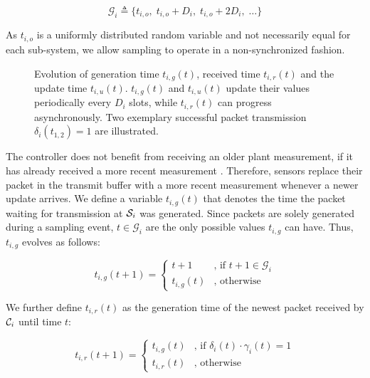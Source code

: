 \begin{equation}
  \mathcal{G}_i \triangleq \lbrace t_{i,o}, \; t_{i,o} + D_{i}, \; t_{i,o} + 2 D_{i}, \; \dots \rbrace 
\end{equation}

As $t_{i,o}$ is a uniformly distributed random variable and not necessarily
equal for each sub-system, we allow sampling to operate in a non-synchronized
fashion. 

\begin{figure}[htb]
  \centering
  \resizebox*{.6\textwidth}{!}{} 

  \caption[Example evolution of generation time $t_{i,g}$, received time
  $t_{i,r}$ and update time $t_{i,u}$]{Evolution of generation time
  $t_{i,g}(t)$, received time $t_{i,r}(t)$ and the update time $t_{i,u}(t)$.
  $t_{i,g}(t)$ and $t_{i,u}(t)$ update their values periodically every $D_i$
  slots, while $t_{i,r}(t)$ can progress asynchronously. Two exemplary
  successful packet transmission $\delta_i(t_{1,2})=1$ are illustrated.}
  \label{fig:ageplot}
\end{figure}  

The controller does not benefit from receiving an older plant measurement, if it
has already received a more recent measurement \cite{costa2016age}. Therefore,
sensors replace their packet in the transmit buffer with a more recent
measurement whenever a newer update arrives. We define a variable $t_{i,g}(t)$
that denotes the time the packet waiting for transmission at $\mathcal{S}_i$ was
generated. Since packets are solely generated during a sampling event, $t \in
\mathcal{G}_i$ are the only possible values $t_{i,g}$ can have. Thus, $t_{i,g}$
evolves as follows:

\begin{equation}
  t_{i,g}(t+1) =
  \begin{cases}
  t+1 & \text{, if } t+1 \in \mathcal{G}_i \\
  t_{i,g}(t) & \text{, otherwise}	
  \end{cases}
\end{equation}

We further define $t_{i,r}(t)$ as the generation time of the newest packet
received by $\mathcal{C}_i$ until time $t$:

\begin{equation}
  t_{i, r}(t+1) =
  \begin{cases}
  t_{i, g}(t) & \text{, if } \delta_i(t) \cdot \gamma_i(t) = 1 \\
  t_{i, r}(t) & \text{, otherwise}	
  \end{cases}
\end{equation}

